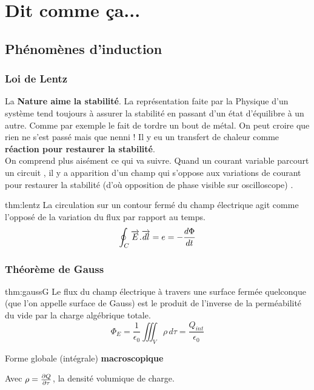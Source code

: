 \section{Dit comme ça...}

\subsection{Phénomènes d'induction}
\subsubsection{Loi de Lentz}
    La \textbf{Nature aime la stabilité}. La représentation faite par la Physique d’un
    système tend toujours à assurer la stabilité en passant d’un état d’équilibre
    à un autre. Comme par exemple le fait de tordre un bout de métal. On peut
    croire que rien ne s’est passé mais que nenni ! Il y eu un transfert de chaleur
    comme \textbf{réaction pour restaurer la stabilité}. \\
    On comprend plus aisément ce qui va suivre. Quand un courant variable parcourt un circuit , il y a apparition d’un champ qui s’oppose aux variations de
    courant pour restaurer la stabilité (d’où opposition de phase visible sur oscilloscope) .

    \begin{theo}{thm:lentz}
        La circulation sur un contour fermé du champ électrique agit comme l'opposé de la variation du flux par rapport au temps.
        \[
        \oint_C \overrightarrow{E}.\overrightarrow{dl} = e = - \dfrac { d \Phi } { d t }
        \]
    \end{theo}

\subsubsection{Théorème de Gauss}
    \begin{theo}{thm:gaussG}
        Le flux du champ électrique à travers une surface fermée quelconque (que l’on
    appelle surface de Gauss) est le produit de l’inverse de la perméabilité du vide par
    la charge algébrique totale.
        \[
        \Phi_E = \frac{1}{\epsilon_0} \iiint_V \rho \,d\tau = \frac{Q_{int}}{\epsilon_0}
        \]
        \begin{center}
            Forme globale (intégrale) \textbf{macroscopique}
        \end{center}
    Avec $\rho = \frac { \partial Q } { \partial \tau }$, la densité volumique de charge.
    \end{theo}

